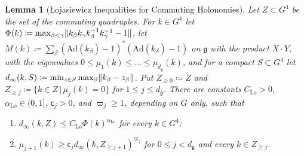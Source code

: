 \documentclass[11pt]{preprint}
\DeclarePairedDelimiter{\norm}{\lVert}{\rVert}
\numberwithin{equation}{section}
\newtheorem{lemma}[theorem]{Lemma}
\theoremstyle{definition}
\theoremstyle{remark}
\theoremstyle{plain}
\begin{document}
\begin{lemma}[{\L}ojasiewicz Inequalities for Commuting Holonomies]\label{lem:lojasiewicz}
Let $Z \subset G^4$ be the set of the commuting quadruples. For $k \in G^4$ let $\Phi(k) \coloneqq \max_{\beta<\gamma}\norm{k_\beta k_\gamma k_\beta^{-1}k_\gamma^{-1} - 1}$, let $M(k) \coloneqq \sum_\beta(\mathrm{Ad}(k_\beta) - 1)^*(\mathrm{Ad}(k_\beta) - 1)$ on $\mathfrak g$ with the product $X \cdot Y$, with the eigenvalues $0 \leq \mu_1(k) \leq \dots \leq \mu_{d_{\mathfrak g}}(k)$, and for a compact $S \subset G^4$ let $d_\infty(k, S) \coloneqq \min_{z \in S}\max_\beta\norm{k_\beta - z_\beta}$. Put $Z_{\geq 0} \coloneqq Z$ and $Z_{\geq j} \coloneqq \{ k \in Z \,|\, \mu_j(k) = 0 \}$ for $1 \leq j \leq d_{\mathfrak g}$. There are constants $C_{\mathrm{Lo}} > 0$, $\alpha_{\mathrm{Lo}} \in (0, 1]$, $\mathsf c_j > 0$, and $\varpi_j \geq 1$, depending on $G$ only, such that
\begin{enumerate}[label=(\roman*)]
\item $d_\infty(k, Z) \leq C_{\mathrm{Lo}}\Phi(k)^{\alpha_{\mathrm{Lo}}}$ for every $k \in G^4$;
\item $\mu_{j+1}(k) \geq \mathsf c_jd_\infty(k, Z_{\geq j+1})^{\varpi_j}$ for $0 \leq j < d_{\mathfrak g}$ and every $k \in Z_{\geq j}$.
\end{enumerate}
\end{lemma}
\end{document}
